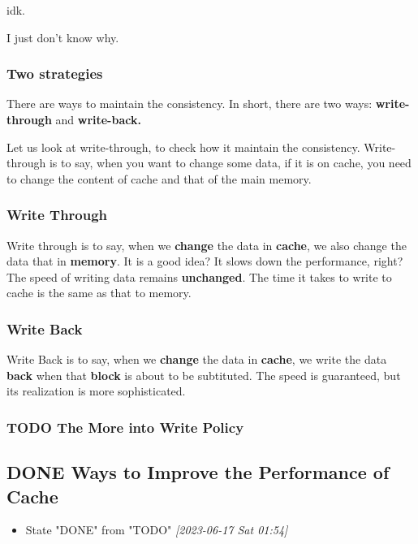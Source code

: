\documentclass[11pt]{article}
\begin{document}
idk.

I just don't know why.

\subsubsection{Two strategies}
\label{sec:org23840a2}

There are ways to maintain the consistency. In short, there are two ways: \textbf{write-through} and \textbf{write-back.}

Let us look at write-through, to check how it maintain the consistency. Write-through is to say, when you want to change some data, if it is on cache, you need to change the content of cache and that of the main memory.

\subsubsection{Write Through}
\label{sec:orgc2192af}

Write through is to say, when we \textbf{change} the data in \textbf{cache}, we also change the data that in \textbf{memory}. It is a good idea? It slows down the performance, right? The speed of writing data remains \textbf{unchanged}. The time it takes to write to cache is the same as that to memory. 

\subsubsection{Write Back}
\label{sec:org56217df}

Write Back is to say, when we \textbf{change} the data in \textbf{cache}, we write the data \textbf{back} when that \textbf{block} is about to be subtituted. The speed is guaranteed, but its realization is more sophisticated.

\subsubsection{{\bfseries\sffamily TODO} The More into Write Policy}
\label{sec:org48e0f25}

\subsection{{\bfseries\sffamily DONE} Ways to Improve the Performance of Cache}
\label{sec:org278e15a}
\begin{itemize}
\item State "DONE"       from "TODO"       \textit{[2023-06-17 Sat 01:54]}
\end{itemize}
\end{document}
